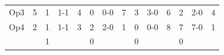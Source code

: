 \documentclass[12pt]{article}  %
\begin{document}
\begin{table}[H]
\begin{tabular}{ccclcclcclcclc}
\multicolumn{1}{c|}{Op3}               & \multicolumn{1}{c|}{\cellcolor[HTML]{67FD9A}5} & \multicolumn{1}{c|}{\cellcolor[HTML]{FFCC67}1} & \multicolumn{1}{l|}{\cellcolor[HTML]{FCFF2F}1-1} & \multicolumn{1}{c|}{\cellcolor[HTML]{67FD9A}4} & \multicolumn{1}{c|}{\cellcolor[HTML]{FFCC67}0} & \multicolumn{1}{l|}{\cellcolor[HTML]{F8FF00}0-0} & \multicolumn{1}{c|}{\cellcolor[HTML]{67FD9A}7} & \multicolumn{1}{c|}{\cellcolor[HTML]{FFCC67}3} & \multicolumn{1}{l|}{\cellcolor[HTML]{F8FF00}3-0} & \multicolumn{1}{c|}{\cellcolor[HTML]{67FD9A}6} & \multicolumn{1}{c|}{\cellcolor[HTML]{FFC702}2} & \multicolumn{1}{l|}{\cellcolor[HTML]{F8FF00}2-0} & \cellcolor[HTML]{FFCCC9}4 \\ \cline{2-13}
\multicolumn{1}{c|}{Op4}               & \multicolumn{1}{c|}{\cellcolor[HTML]{67FD9A}2} & \multicolumn{1}{c|}{\cellcolor[HTML]{FFCC67}1} & \multicolumn{1}{l|}{\cellcolor[HTML]{FCFF2F}1-1} & \multicolumn{1}{c|}{\cellcolor[HTML]{67FD9A}3} & \multicolumn{1}{c|}{\cellcolor[HTML]{FFCC67}2} & \multicolumn{1}{l|}{\cellcolor[HTML]{F8FF00}2-0} & \multicolumn{1}{c|}{\cellcolor[HTML]{67FD9A}1} & \multicolumn{1}{c|}{\cellcolor[HTML]{FFCC67}0} & \multicolumn{1}{l|}{\cellcolor[HTML]{F8FF00}0-0} & \multicolumn{1}{c|}{\cellcolor[HTML]{67FD9A}8} & \multicolumn{1}{c|}{\cellcolor[HTML]{FFC702}7} & \multicolumn{1}{l|}{\cellcolor[HTML]{F8FF00}7-0} & \cellcolor[HTML]{FFCCC9}1 \\ \cline{2-13}
\multicolumn{1}{l}{}                   &                                                & \cellcolor[HTML]{FD6864}1                      & \multicolumn{1}{c}{}                             &                                                & \cellcolor[HTML]{FD6864}0                      & \multicolumn{1}{c}{}                             &                                                & \cellcolor[HTML]{FD6864}0                      & \multicolumn{1}{c}{}                             &                                                & \cellcolor[HTML]{FD6864}0                      &                                                  & \multicolumn{1}{l}{}     
\end{tabular}
\end{table}
\end{document}
